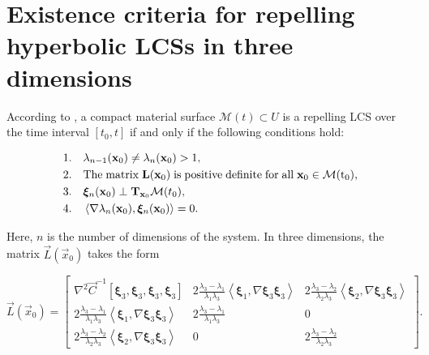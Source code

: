 
\chapter{Existence criteria for repelling hyperbolic LCSs in three dimensions}\label{ch:appendix_a}

According to \cite{Haller14Errata}, a compact material surface $\mathcal{M}(t)\subset U$ is a repelling LCS over the time interval $[t_0,t]$ if and only if the following conditions hold:

\begin{align}\label{eq:Original_ExistenceConditions}
\begin{aligned}
	1.&\quad \lambda_{n-1}(\mathbf{x}_0) \neq \lambda_n(\mathbf{x}_0) > 1,\\
	2.&\quad \rm{The \; matrix \;} \mathbf{L}(\mathbf{x}_0)  \; is \; positive \; definite \; for \; all \; \mathbf{x}_0 \in \mathcal{M}(t_0),\\
	3.&\quad \bm{\xi}_n(\mathbf{x}_0) \perp \mathbf{T}_{\mathbf{x}_0}\mathcal{M}(t_0),\\
	4.&\quad \left\langle \nabla\lambda_n(\mathbf{x}_0), \bm{\xi}_n(\mathbf{x}_0)\right\rangle = 0.
\end{aligned}
\end{align}

\noindent Here, $n$ is the number of dimensions of the system. In three dimensions, the matrix $\vec{L}(\vec{x}_0)$ takes the form

\begin{equation}\label{eq:L-matrix}
	\vec{L}(\vec{x}_0) =
	\begin{bmatrix}
		\nabla^2\vec{C}^{-1}[\bm{\xi}_3,\bm{\xi}_3,\bm{\xi}_3,\bm{\xi}_3] & 2\frac{\lambda_3-\lambda_1}{\lambda_1\lambda_3}\left\langle \bm{\xi}_1,\nabla\bm{\xi}_3\bm{\xi}_3\right\rangle & 2\frac{\lambda_3-\lambda_2}{\lambda_2\lambda_3}\left\langle \bm{\xi}_2,\nabla\bm{\xi}_3\bm{\xi}_3\right\rangle \\[2ex]
		2\frac{\lambda_3-\lambda_1}{\lambda_1\lambda_3}\left\langle \bm{\xi}_1,\nabla\bm{\xi}_3\bm{\xi}_3\right\rangle & 2\frac{\lambda_3-\lambda_1}{\lambda_1\lambda_3} & 0 \\[2ex]
		2\frac{\lambda_3-\lambda_2}{\lambda_2\lambda_3}\left\langle\bm{\xi}_2,\nabla\bm{\xi}_3\bm{\xi}_3\right\rangle & 0 & 2\frac{\lambda_3-\lambda_2}{\lambda_2\lambda_3}
	\end{bmatrix}.
\end{equation}

